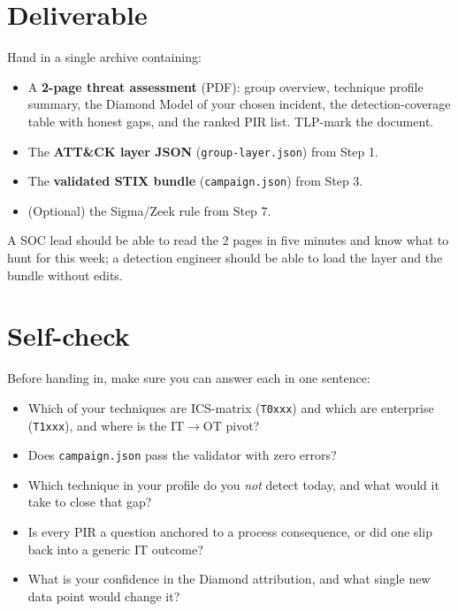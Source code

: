 \documentclass[11pt,a4paper]{article}
\begin{document}
\section*{Deliverable}

\begin{deliverbox}
Hand in a single archive containing:
\begin{itemize}\setlength{\itemsep}{1pt}
  \item A \textbf{2-page threat assessment} (PDF): group overview, technique
        profile summary, the Diamond Model of your chosen incident, the
        detection-coverage table with honest gaps, and the ranked PIR list.
        TLP-mark the document.
  \item The \textbf{ATT\&CK layer JSON} (\texttt{group-layer.json}) from Step 1.
  \item The \textbf{validated STIX bundle} (\texttt{campaign.json}) from Step 3.
  \item (Optional) the Sigma/Zeek rule from Step 7.
\end{itemize}
A SOC lead should be able to read the 2 pages in five minutes and know what to
hunt for this week; a detection engineer should be able to load the layer and
the bundle without edits.
\end{deliverbox}

\section*{Self-check}

Before handing in, make sure you can answer each in one sentence:
\begin{itemize}\setlength{\itemsep}{1pt}
  \item Which of your techniques are ICS-matrix (\texttt{T0xxx}) and which are
        enterprise (\texttt{T1xxx}), and where is the IT$\to$OT pivot?
  \item Does \texttt{campaign.json} pass the validator with zero errors?
  \item Which technique in your profile do you \emph{not} detect today, and what
        would it take to close that gap?
  \item Is every PIR a question anchored to a process consequence, or did one
        slip back into a generic IT outcome?
  \item What is your confidence in the Diamond attribution, and what single new
        data point would change it?
\end{itemize}
\end{document}

